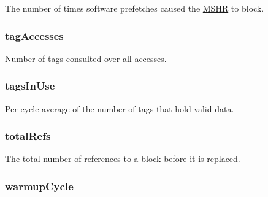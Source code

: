 \label{group__CacheStatistics_ga673f963f100608daf064537a4dde7ec7}
The number of times software prefetches caused the \hyperlink{classMSHR}{MSHR} to block. \hypertarget{group__CacheStatistics_ga42eda9fe19a58cfd6ed7aaa7427664e4}{
\subsubsection[{tagAccesses}]{ tagAccesses}}
\label{group__CacheStatistics_ga42eda9fe19a58cfd6ed7aaa7427664e4}
Number of tags consulted over all accesses. \hypertarget{group__CacheStatistics_gac47f8631e7a5c6ca2d7bdc4a3385ef5c}{
\subsubsection[{tagsInUse}]{ tagsInUse}}
\label{group__CacheStatistics_gac47f8631e7a5c6ca2d7bdc4a3385ef5c}
Per cycle average of the number of tags that hold valid data. \hypertarget{group__CacheStatistics_gaafe04ce7df5e42da3c45e3991561520e}{
\subsubsection[{totalRefs}]{ totalRefs}}
\label{group__CacheStatistics_gaafe04ce7df5e42da3c45e3991561520e}
The total number of references to a block before it is replaced. \hypertarget{group__CacheStatistics_ga2607cf0f839148422c1a78a9e21e2c29}{
\subsubsection[{warmupCycle}]{ warmupCycle}}
